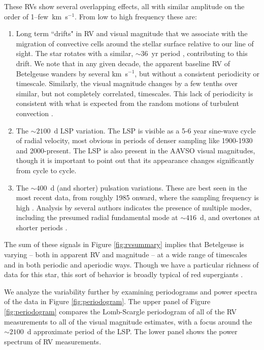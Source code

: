 \documentclass[twocolumn]{aastex631}
\begin{document}
These RVs show several overlapping effects, all with similar amplitude on the order of 1--few~km~s$^{-1}$. From low to high frequency these are:  
\begin{enumerate}
    \item Long term ``drifts" in RV and visual magnitude that we associate with the migration of convective cells around the stellar surface relative to our line of sight. The star rotates with a similar, $\sim 36 $~yr period \citep{2018A&A...609A..67K}, contributing to this drift. We note that in any given decade, the apparent baseline RV of Betelgeuse wanders by several km~s$^{-1}$, but without a consistent periodicity or timescale. Similarly, the visual magnitude changes by a few tenths over similar, but not completely correlated, timescales. This lack of periodicity is consistent with what is expected from the random motions of turbulent convection \citep[e.g.][]{2006MNRAS.372.1721K}.  
    
    \item The $\sim 2100$~d LSP variation. The LSP is visible as a 5-6 year sine-wave cycle of  radial velocity, most obvious in periods of denser sampling like 1900-1930 and 2000-present. The LSP is also present in the AAVSO visual magnitudes, though it is important to point out that its appearance changes significantly from cycle to cycle. 
    
    \item The $\sim 400$~d (and shorter) pulsation variations.  These are best seen in the most recent data, from roughly 1985 onward, where the sampling frequency is high \citep[see, for example, the presentation of the STELLA data by][]{2022csss.confE.185G}.  Analysis by several authors indicates the presence of multiple modes, including the presumed radial fundamental mode at $\sim 416$~d, and overtones at shorter periods \citep{2020ApJ...902...63J,2022csss.confE.185G,2023NewA...9901962J,2023ApJ...956...27M}.  
\end{enumerate}

The sum of these signals in Figure \ref{fig:rvsummary} implies that Betelgeuse is varying -- both in apparent RV and magnitude -- at a wide range of timescales and in both periodic and aperiodic ways. Though we have a particular richness of data for this star, this sort of behavior is broadly typical of red supergiants \citep[e.g.][]{2006MNRAS.372.1721K,2017ars..book.....L,2024A&A...682A..88P,2024arXiv240809089G}.  

We analyze the variability further by examining periodograms and power spectra of the data in Figure \ref{fig:periodogram}. The upper panel of Figure \ref{fig:periodogram} compares the Lomb-Scargle periodogram of all of the RV measurements to all of the visual magnitude estimates, with a focus around the $\sim 2100$~d approximate period of the LSP. The lower panel shows the power spectrum of RV measurements. 
\end{document}

